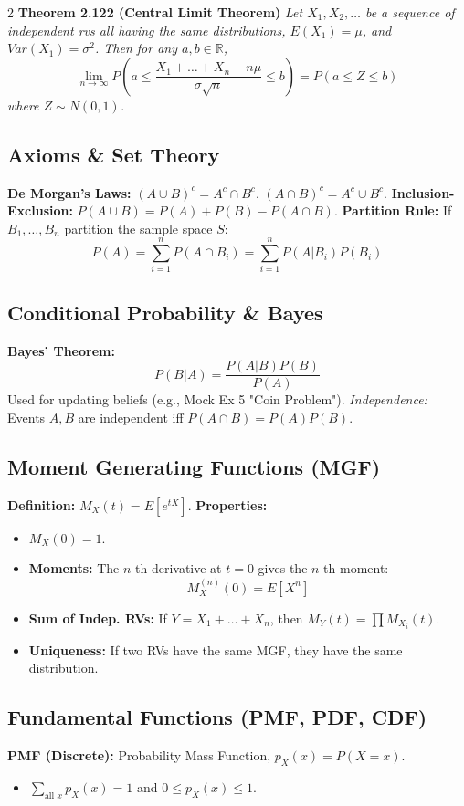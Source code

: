 \documentclass[10pt, letterpaper]{article}
\begin{document}
\begin{multicols*}{2}
\noindent\textbf{Theorem 2.122 (\colorbox{pink!30}{Central} Limit Theorem)} \textit{Let $X_1, X_2, \dots$ be a sequence of independent rvs all having the same distributions, $E(X_1) = \mu$, and $Var(X_1) = \sigma^2$. Then for any $a, b \in \mathbb{R}$,}
\[
\boxed{ \lim_{n\to\infty} P\left( a \le \frac{X_1 + \dots + X_n - n\mu}{\sigma\sqrt{n}} \le b \right) = P(a \le Z \le b) }
\]
\textit{where $Z \sim N(0, 1)$.}

\subsection{Axioms \& Set Theory}
\textbf{De Morgan's Laws:} $(A \cup B)^c = A^c \cap B^c$. $(A \cap B)^c = A^c \cup B^c$.
\textbf{Inclusion-Exclusion:} $P(A \cup B) = P(A) + P(B) - P(A \cap B)$.
\textbf{Partition Rule:} If $B_1, \dots, B_n$ partition the sample space $S$:
$$ P(A) = \sum_{i=1}^n P(A \cap B_i) = \sum_{i=1}^n P(A|B_i)P(B_i) $$

\subsection{Conditional Probability \& Bayes}
\textbf{Bayes' Theorem:} 
$$ P(B|A) = \frac{P(A|B)P(B)}{P(A)} $$
Used for updating beliefs (e.g., Mock Ex 5 "Coin Problem").
\textit{Independence:} Events $A, B$ are independent iff $P(A \cap B) = P(A)P(B)$.

\subsection{Moment Generating Functions (MGF)}
\textbf{Definition:} $M_X(t) = E[e^{tX}]$.
\textbf{Properties:}
\begin{itemize}
    \item $M_X(0) = 1$.
    \item \textbf{Moments:} The $n$-th derivative at $t=0$ gives the $n$-th moment:
    $$ M_X^{(n)}(0) = E[X^n] $$
    \item \textbf{Sum of Indep. RVs:} If $Y = X_1 + \dots + X_n$, then $M_Y(t) = \prod M_{X_i}(t)$.
    \item \textbf{Uniqueness:} If two RVs have the same MGF, they have the same distribution.
\end{itemize}

\subsection{Fundamental Functions (PMF, PDF, CDF)}
\textbf{PMF (Discrete):} Probability Mass Function, $p_X(x) = P(X=x)$.
\begin{itemize}
    \item $\sum_{\text{all } x} p_X(x) = 1$ and $0 \le p_X(x) \le 1$.
\end{itemize}


\end{multicols*}
\end{document}
